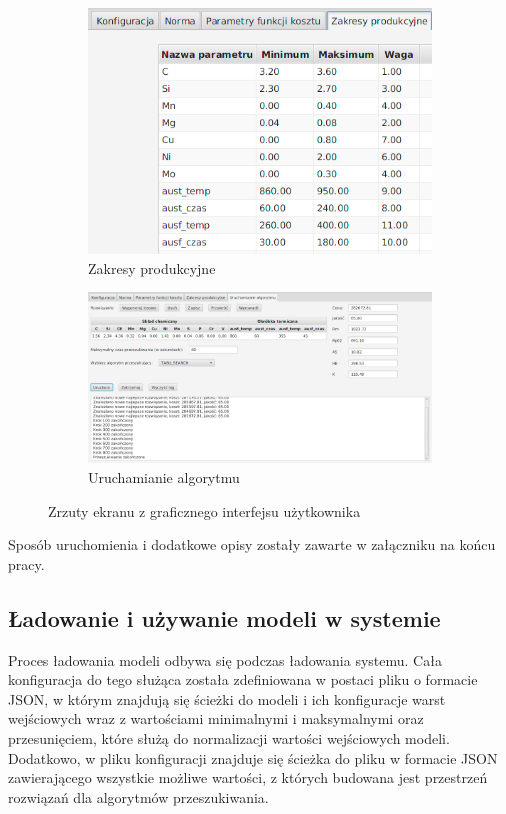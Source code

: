 \begin{figure}
\begin{subfigure}[b]{0.3\textwidth}
    \end{subfigure}
    \hfill
    \begin{subfigure}[b]{0.7\textwidth}
    	\centering
    	\includegraphics[scale=0.6]{images/prod_range.png}
    	\caption {
    		 Zakresy produkcyjne
    	}
    	\label{fig:prod-range-tab}
    \end{subfigure}
    \vfill
    \begin{subfigure}[b]{\textwidth}
    	\centering
    	\includegraphics[scale=0.45]{images/algo_run.png}
    	\caption {
    		 Uruchamianie algorytmu
    	}
    	\label{fig:algo-run-tab}
    \end{subfigure}
    \caption{Zrzuty ekranu z graficznego interfejsu użytkownika}
    \label{fig:three graphs}
\end{figure}

Sposób uruchomienia i dodatkowe opisy zostały zawarte w załączniku na końcu pracy.

\FloatBarrier

\subsection{Ładowanie i używanie modeli w systemie}
Proces ładowania modeli odbywa się podczas ładowania systemu. Cała konfiguracja do tego służąca została zdefiniowana w postaci pliku o formacie JSON, w którym znajdują się ścieżki do modeli i ich konfiguracje warst wejściowych wraz z wartościami minimalnymi i maksymalnymi oraz przesunięciem, które służą do normalizacji wartości wejściowych modeli. Dodatkowo, w pliku konfiguracji znajduje się ścieżka do pliku w formacie JSON zawierającego wszystkie możliwe wartości, z których budowana jest przestrzeń rozwiązań dla algorytmów przeszukiwania. 

